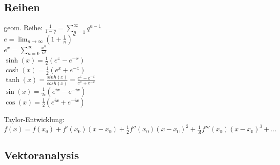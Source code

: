 \documentclass[12pt,a4paper, twoside]{article}
\renewcommand{\=}[1]{\stackrel{#1}{=}}
\theoremstyle{definition}
\theoremstyle{remark}
\begin{document}
\subsection{Reihen}

\begin{center}
\begin{minipage}[t]{.49\linewidth}
\vspace{0pt}
geom. Reihe: $\frac{1}{1-q} = \sum_{n = 1}^{\infty} q^{n-1}$\\
$e = \lim_{n \rightarrow \infty} (1 + \frac{1}{n})^n$\\
$e^x = \sum_{n=0}^{\infty} \frac{x^n}{n!}$\\
$\sinh(x) = \frac{1}{2} (e^x - e^{-x})$\\
$\cosh(x) = \frac{1}{2} (e^x + e^{-x})$\\
$\tanh(x) = \frac{sinh(x)}{cosh(x)} = \frac{e^x - e^{-x}}{e^x + e^{-x}}$\\
$\sin(x) = \frac{1}{2i}(e^{ix} - e^{-ix})$\\
$\cos(x) = \frac{1}{2}(e^{ix}+e^{-ix})$
\end{minipage}%
\begin{minipage}[t]{.49\linewidth}
\vspace{0pt}

\begin{framed}
Taylor-Entwicklung: $f(x) = f(x_0) + f'(x_0) (x-x_0) + \frac{1}{2} f''(x_0)(x-x_0)^2 + \frac{1}{3!} f'''(x_0) (x-x_0)^3 + ...$
\end{framed}

\end{minipage}
\end{center}


\subsection{Vektoranalysis}
\end{document}
